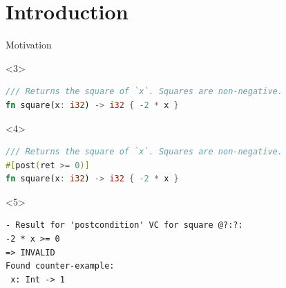 \maketitle

\section{Introduction}

\begin{frame}[fragile]{Motivation}
\centering
{}


\begin{onlyenv}<3>
\begin{lstlisting}[style=short, language=Rust]
/// Returns the square of `x`. Squares are non-negative.
fn square(x: i32) -> i32 { -2 * x }
\end{lstlisting}
\end{onlyenv}
\begin{onlyenv}<4>
\begin{lstlisting}[style=short, language=Rust]
/// Returns the square of `x`. Squares are non-negative.
#[post(ret >= 0)]
fn square(x: i32) -> i32 { -2 * x }
\end{lstlisting}
\end{onlyenv}
\begin{onlyenv}<5>
\begin{lstlisting}[style=short]
- Result for 'postcondition' VC for square @?:?:
-2 * x >= 0
=> INVALID
Found counter-example:
 x: Int -> 1
\end{lstlisting}
\end{onlyenv}
\end{frame}


